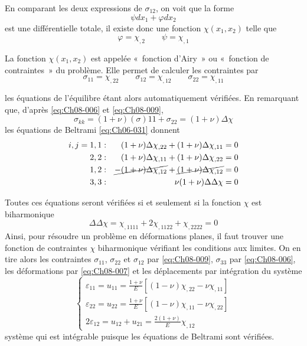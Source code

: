 En comparant les deux expressions de $\sigma_{12}$, on voit que la forme 
\begin{equation*}
\psi dx_1 + \varphi dx_2
\end{equation*}
est une différentielle totale, il existe donc une fonction $\chi(x_1,x_2)$ telle que 
\begin{equation*}
\varphi=\chi_{,2} \qquad \psi=\chi_{,1}
\end{equation*}

La fonction $\chi(x_1,x_2)$ est appelée «~fonction d'Airy~» ou «~fonction de contraintes~» du problème. 
Elle permet de calculer les contraintes par 
\begin{equation}
\sigma_{11}=\chi_{,22} \qquad \sigma_{12}=\chi_{,12} \qquad \sigma_{22}=\chi_{,11}
    \label{eq:Ch08-009}
\end{equation}

les équations de l'équilibre étant alors automatiquement vérifiées. 
En remarquant que, d'après \eqref{eq:Ch08-006} et \eqref{eq:Ch08-009}, 
\begin{equation}
\sigma_{kk}=(1+\nu)(\sigma){11}+\sigma_{22}=(1+\nu)\Delta\chi
\label{eq:Ch08-010}
\end{equation}
les équations de Beltrami \eqref{eq:Ch06-031} donnent 
\begin{equation}
  \begin{aligned}
  i,j = 1,1 & : &  (1+\nu) \Delta\chi_{,22} + (1+\nu) \Delta\chi_{,11}=0 \\
        2,2 & : &  (1+\nu) \Delta\chi_{,11} + (1+\nu) \Delta\chi_{,22}=0 \\ 
        1,2 & : & \cancel{-(1+\nu) \Delta\chi_{,12}} + \cancel{(1+\nu) \Delta\chi_{,12}}=0 \\
        3,3 & : & \nu(1+\nu) \Delta\Delta\chi = 0 \\
  \end{aligned}
\label{eq:Ch08-011}
\end{equation}

Toutes ces équations seront vérifiées si et seulement si la fonction $\chi$ est biharmonique 
\begin{equation}
\Delta\Delta\chi=\chi_{,1111}+2\chi_{,1122}+\chi_{,2222}=0
\label{eq:Ch08-012}
\end{equation}
Ainsi, pour résoudre un problème en déformations planes, il faut trouver une fonction de contraintes $\chi$ biharmonique vérifiant les conditions aux limites. 
On en tire alors les contraintes $\sigma_{11}$, $\sigma_{22}$ et $\sigma_{12}$ par \eqref{eq:Ch08-009}, $\sigma_{33}$ par \eqref{eq:Ch08-006}, les déformations par \eqref{eq:Ch08-007} et les déplacements par intégration du système 
\begin{equation}
  \begin{cases}
  \varepsilon_{11}=u_{11}=\frac{1+\nu}{E}[(1-\nu)\chi_{,22}-\nu\chi_{,11}] \\
  \varepsilon_{22}=u_{22}=\frac{1+\nu}{E}[(1-\nu)\chi_{,11}-\nu\chi_{,22}] \\
  2\varepsilon_{12}=u_{12}+u_{21}=\frac{2(1+\nu)}{E}\chi_{,12}
  \end{cases}
\label{eq:Ch08-013}
\end{equation}
système qui est intégrable puisque les équations de Beltrami sont vérifiées. 
